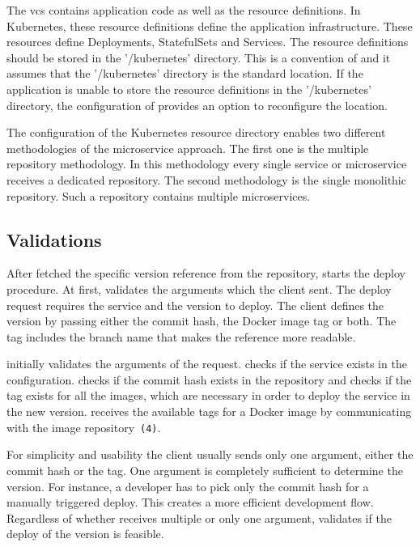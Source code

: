 The \gls{vcs} contains application code as well as the resource
definitions. In Kubernetes, these resource definitions define the application
infrastructure. These resources define Deployments, StatefulSets and
Services. The resource definitions should be stored in the '/kubernetes' directory. This
is a convention of \deployer{} and it assumes that the '/kubernetes' directory is the
standard location. If the application is unable to store the resource definitions in the
'/kubernetes' directory, the configuration of \deployer{} provides an option to reconfigure
the location.

The configuration of the Kubernetes resource directory enables two different methodologies
of the microservice approach. The first one is the multiple repository methodology. In
this methodology every single service or microservice receives a dedicated repository.
The second methodology is the single monolithic repository. Such a repository contains
multiple microservices.

\subsection{Validations}

After \deployer{} fetched the specific version reference from the repository, \deployer{} starts
the deploy procedure. At first, \deployer{} validates the arguments which the client
sent. The deploy request requires the service and the version to deploy. The client
defines the version by passing either the commit hash, the Docker image tag or both. The
tag includes the branch name that makes the reference more readable.

\deployer{} initially validates the arguments of the request. \deployer{} checks if the service
exists in the configuration. \deployer{} checks if the commit hash exists in the repository
and \deployer{} checks if the tag exists for all the images, which are necessary in order to
deploy the service in the new version. \deployer{} receives the available tags for a Docker
image by communicating with the image repository~\texttt{(4)}.

For simplicity and usability the client usually sends only one argument, either the commit
hash or the tag. One argument is completely sufficient to determine the version. For instance, a developer has to pick only the
commit hash for a manually triggered deploy. This creates a more efficient development
flow. Regardless of whether \deployer{} receives multiple or only one argument, \deployer{}
validates if the deploy of the version is feasible.

